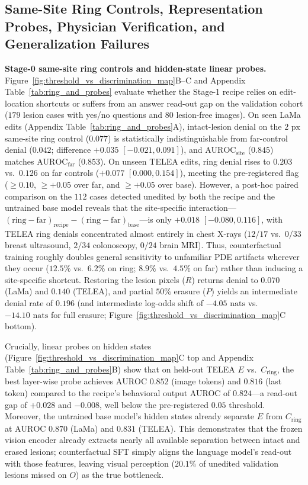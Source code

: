 \documentclass{article} %
\begin{document}
\subsection{Same-Site Ring Controls, Representation Probes, Physician Verification, and Generalization Failures}
\label{subsec:exp_probes_readers_failures}
\textbf{Stage-0 same-site ring controls and hidden-state linear probes.} Figure~\ref{fig:threshold_vs_discrimination_map}B--C and Appendix Table~\ref{tab:ring_and_probes} evaluate whether the Stage-1 recipe relies on edit-location shortcuts or suffers from an answer read-out gap on the validation cohort ($179$ lesion cases with yes/no questions and $80$ lesion-free images). On seen LaMa edits (Appendix Table~\ref{tab:ring_and_probes}A), intact-lesion denial on the $2\text{ px}$ same-site ring control ($0.077$) is statistically indistinguishable from far-control denial ($0.042$; difference $+0.035$ $[-0.021, 0.091]$), and $\text{AUROC}_{\text{site}}$ ($0.845$) matches $\text{AUROC}_{\text{far}}$ ($0.853$). On unseen TELEA edits, ring denial rises to $0.203$ vs.\ $0.126$ on far controls ($+0.077$ $[0.000, 0.154]$), meeting the pre-registered flag ($\ge 0.10$, $\ge +0.05$ over far, and $\ge +0.05$ over base). However, a post-hoc paired comparison on the $112$ cases detected unedited by both the recipe and the untrained base model reveals that the site-specific interaction---$(\text{ring} - \text{far})_{\text{recipe}} - (\text{ring} - \text{far})_{\text{base}}$---is only $+0.018$ $[-0.080, 0.116]$, with TELEA ring denials concentrated almost entirely in chest X-rays ($12/17$ vs.\ $0/33$ breast ultrasound, $2/34$ colonoscopy, $0/24$ brain MRI). Thus, counterfactual training roughly doubles general sensitivity to unfamiliar PDE artifacts wherever they occur ($12.5\%$ vs.\ $6.2\%$ on ring; $8.9\%$ vs.\ $4.5\%$ on far) rather than inducing a site-specific shortcut. Restoring the lesion pixels ($R$) returns denial to $0.070$ (LaMa) and $0.140$ (TELEA), and partial $50\%$ erasure ($P$) yields an intermediate denial rate of $0.196$ (and intermediate log-odds shift of $-4.05\text{ nats}$ vs.\ $-14.10\text{ nats}$ for full erasure; Figure~\ref{fig:threshold_vs_discrimination_map}C bottom).

Crucially, linear probes on hidden states (Figure~\ref{fig:threshold_vs_discrimination_map}C top and Appendix Table~\ref{tab:ring_and_probes}B) show that on held-out TELEA $E$ vs.\ $C_{\text{ring}}$, the best layer-wise probe achieves $\text{AUROC } 0.852$ (image tokens) and $0.816$ (last token) compared to the recipe's behavioral output AUROC of $0.824$---a read-out gap of $+0.028$ and $-0.008$, well below the pre-registered $0.05$ threshold. Moreover, the untrained base model's hidden states already separate $E$ from $C_{\text{ring}}$ at $\text{AUROC } 0.870$ (LaMa) and $0.831$ (TELEA). This demonstrates that the frozen vision encoder already extracts nearly all available separation between intact and erased lesions; counterfactual SFT simply aligns the language model's read-out with those features, leaving visual perception ($20.1\%$ of unedited validation lesions missed on $O$) as the true bottleneck.
\end{document}
